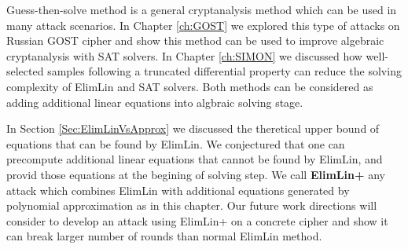 Guess-then-solve method is a general cryptanalysis method which can be used in many attack scenarios. In Chapter \ref{ch:GOST} we explored this type of attacks on Russian GOST cipher and show this method can be used to improve algebraic cryptanalysis with SAT solvers. In Chapter \ref{ch:SIMON} we discussed how well-selected samples following a truncated differential property can reduce the solving complexity of ElimLin and SAT solvers. Both methods can be considered as adding additional linear equations into algbraic solving stage.

In Section \ref{Sec:ElimLinVsApprox} we discussed the theretical upper bound of equations that can be found by ElimLin. We conjectured that one can precompute additional linear equations that cannot be found by ElimLin, and provid those equations at the begining of solving step. We call \textbf{ElimLin+} any attack which combines ElimLin with additional equations generated by polynomial approximation as in this chapter. Our future work directions will consider to develop an attack using ElimLin+ on a concrete cipher and show it can break larger number of rounds than normal ElimLin method.